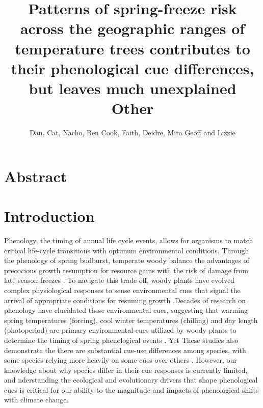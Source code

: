 \documentclass[12pt]{article}
\title{
Patterns of spring-freeze risk across the geographic ranges of temperature trees contributes to their phenological cue differences, but leaves much unexplained\\
Other
}
\author{Dan, Cat, Nacho, Ben Cook, Faith, Deidre, Mira Geoff and Lizzie}
\begin{document}

\maketitle

\section*{Abstract}
\section*{Introduction}


Phenology, the timing of annual life cycle events, allows for organisms to match critical life-cycle transitions with optimum environmental conditions. Through the phenology of spring budburst, temperate woody balance the advantages of precocious growth resumption for resource gains with the risk of damage from late season freezes \citep{Savage:2013aa}. To navigate this trade-off, woody plants have evolved complex physiological responses to sense environmental cues that signal the arrival of appropriate conditions for resuming growth \citep{}.Decades of research on phenology have elucidated these environmental cues, suggesting that warming spring temperatures (forcing), cool winter temperatures (chilling) and day length (photoperiod) are primary environmental cues utilized by woody plants to determine the timing of spring phenological events \citep{Ettinger:2020aa,Forrest2010}. Yet These studies also demonstrate the there are substantial cue-use differences among species, with some species relying more heavily on some cues over others \citep{Laube:2014aa}. However, our knowledge about why species differ in their cue responses is currently limited, and nderstanding the ecological and evolutionary drivers that shape phenological cues is critical for our ability to the magnitude and impacts of phenological shifts with climate change.
\end{document}
